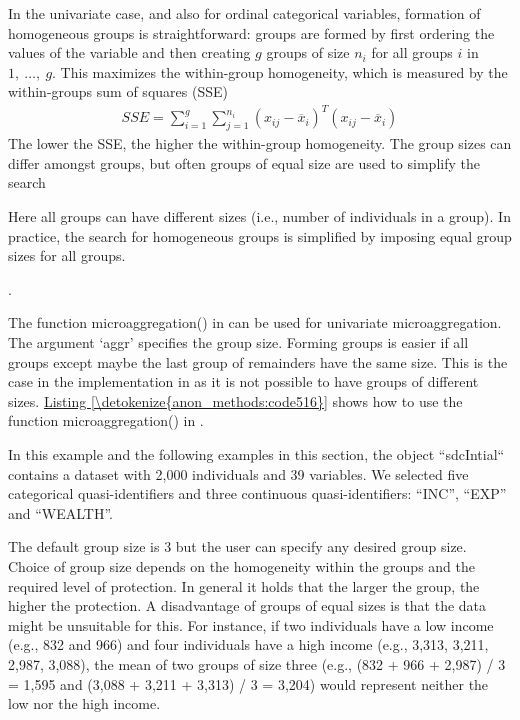 \documentclass[letterpaper,10pt,english]{sphinxmanual}
\begin{document}
In the univariate case, and also for ordinal categorical variables,
formation of homogeneous groups is straightforward: groups are formed by
first ordering the values of the variable and then creating \(g\)
groups of size \(n_{i}\) for all groups \(i\) in
\(1,\ \ldots,\ g\). This maximizes the within-group homogeneity,
which is measured by the within-groups sum of squares (SSE)
\begin{equation*}
\begin{split}SSE = \sum_{i = 1}^{g}{\sum_{j = 1}^{n_{i}}{\left( x_{ij} - {\overline{x}}_{i} \right)^{T}\left( x_{ij} - {\overline{x}}_{i} \right)}}\end{split}
\end{equation*}
The lower the SSE, the higher the within-group homogeneity. The group
sizes can differ amongst groups, but often groups of equal size are used
to simplify the search %
\begin{footnote}[15]\sphinxAtStartFootnote
Here all groups can have different sizes (i.e., number of
individuals in a group). In practice, the search for homogeneous
groups is simplified by imposing equal group sizes for all groups.
%
\end{footnote}.

The function microaggregation() in  can be used for univariate
microaggregation. The argument ‘aggr’ specifies the group size. Forming
groups is easier if all groups \textendash{} except maybe the last group of
remainders \textendash{} have the same size. This is the case in the implementation
in  as it is not possible to have groups of different sizes.
\hyperref[\detokenize{anon_methods:code516}]{Listing \ref{\detokenize{anon_methods:code516}}} shows how to use the function microaggregation() in
. %
\begin{footnote}[16]\sphinxAtStartFootnote
In this example and the following examples in this section, the
 object “sdcIntial“ contains a dataset with 2,000
individuals and 39 variables. We selected five categorical
quasi-identifiers and three continuous quasi-identifiers: “INC”,
“EXP” and “WEALTH”.
%
\end{footnote} The default group size is 3 but the
user can specify any desired group size. Choice of group size depends on
the homogeneity within the groups and the required level of protection.
In general it holds that the larger the group, the higher the
protection. A disadvantage of groups of equal sizes is that the data
might be unsuitable for this. For instance, if two individuals have a
low income (e.g., 832 and 966) and four individuals have a high income
(e.g., 3,313, 3,211, 2,987, 3,088), the mean of two groups of size three
(e.g., (832 + 966 + 2,987) / 3 = 1,595 and (3,088 + 3,211 + 3,313) / 3 =
3,204) would represent neither the low nor the high income.
\end{document}
